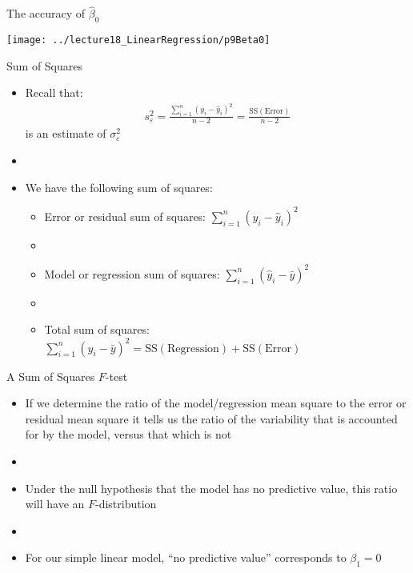 \documentclass[xcolor=dvipsnames]{beamer}
\begin{document}
\begin{frame}{The accuracy of $\hat{\beta}_0$}
\begin{center}
	\texttt{[image: ../lecture18\_LinearRegression/p9Beta0]}
\end{center}
\end{frame}

\begin{frame}{Sum of Squares}
	\begin{itemize}
		\item Recall that: 
		\begin{gather*}
		s^2_{\varepsilon} = \frac{\sum_{i=1}^{n}\left(y_i - \hat{y}_i\right)^2}{n-2} = \frac{\text{SS}(\text{Error})}{n-2}
		\end{gather*} 
		is an estimate of $\sigma_{\varepsilon}^2$ \pause
		\item[]
		\item We have the following sum of squares: \pause
		\begin{itemize}
			\item Error or residual sum of squares: $\sum_{i=1}^n (y_i - \hat{y}_i)^2$ \pause
			\item[]
			\item Model or regression sum of squares: $\sum_{i=1}^n (\hat{y}_i-\bar{y})^2$ \pause
			\item[]
			\item Total sum of squares: $\sum_{i=1}^n (y_i -\bar{y})^2 = \text{SS}(\text{Regression})+\text{SS}(\text{Error})$
		\end{itemize}
	\end{itemize}
\end{frame}

\begin{frame}{A Sum of Squares $F$-test}
	\begin{itemize}
		\item If we determine the ratio of the model/regression mean square to the error or residual mean square it tells us the ratio of the variability that is accounted for by the model, versus that which is not \pause
		\item[]
		\item Under the null hypothesis that the model has no predictive value, this ratio will have an $F$-distribution \pause
		\item[]
		\item For our simple linear model, ``no predictive value'' corresponds to $\beta_1 = 0$
	\end{itemize}
\end{frame}
\end{document}
